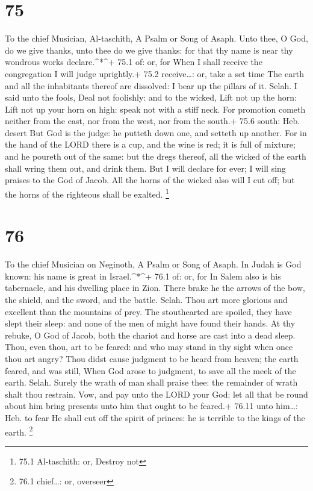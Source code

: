 \hypertarget{section-74}{%
\section{75}\label{section-74}}

To the chief Musician, Al-taschith, A Psalm or Song of Asaph.
 Unto thee, O God, do we give thanks, unto thee do we give
thanks: for that thy name is near thy wondrous works declare.\^{}*\^{}+
75.1 of: or, for  When I shall receive the congregation I
will judge uprightly.+ 75.2 receive\ldots: or, take a set time
 The earth and all the inhabitants thereof are dissolved: I
bear up the pillars of it. Selah.  I said unto the fools,
Deal not foolishly: and to the wicked, Lift not up the horn:
 Lift not up your horn on high: speak not with a stiff neck.
 For promotion cometh neither from the east, nor from the
west, nor from the south.+ 75.6 south: Heb. desert  But God
is the judge: he putteth down one, and setteth up another. 
For in the hand of the LORD there is a cup, and the wine is red; it is
full of mixture; and he poureth out of the same: but the dregs thereof,
all the wicked of the earth shall wring them out, and drink them.
 But I will declare for ever; I will sing praises to the God
of Jacob.  All the horns of the wicked also will I cut off;
but the horns of the righteous shall be exalted. \footnote{75.1
  Al-taschith: or, Destroy not}

\hypertarget{section-75}{%
\section{76}\label{section-75}}

To the chief Musician on Neginoth, A Psalm or Song of Asaph.
 In Judah is God known: his name is great in
Israel.\^{}*\^{}+ 76.1 of: or, for  In Salem also is his
tabernacle, and his dwelling place in Zion.  There brake he
the arrows of the bow, the shield, and the sword, and the battle. Selah.
 Thou art more glorious and excellent than the mountains of
prey.  The stouthearted are spoiled, they have slept their
sleep: and none of the men of might have found their hands. 
At thy rebuke, O God of Jacob, both the chariot and horse are cast into
a dead sleep.  Thou, even thou, art to be feared: and who
may stand in thy sight when once thou art angry?  Thou didst
cause judgment to be heard from heaven; the earth feared, and was still,
 When God arose to judgment, to save all the meek of the
earth. Selah.  Surely the wrath of man shall praise thee:
the remainder of wrath shalt thou restrain.  Vow, and pay
unto the LORD your God: let all that be round about him bring presents
unto him that ought to be feared.+ 76.11 unto him\ldots: Heb. to fear
 He shall cut off the spirit of princes: he is terrible to
the kings of the earth. \footnote{76.1 chief\ldots: or, overseer}

